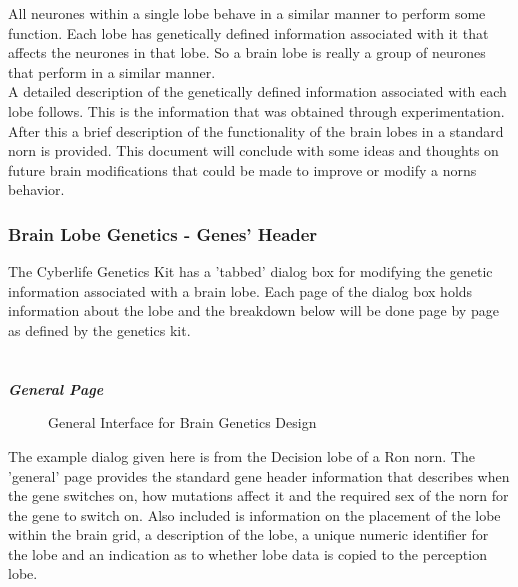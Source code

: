 \documentclass[11pt,twoside,a4paper]{article}
\begin{document}
All neurones within a single lobe behave in a similar manner to perform some function. Each lobe has genetically defined information associated with it that affects the neurones in that lobe. So a brain lobe is really a group of neurones that perform in a similar manner.~\\

A detailed description of the genetically defined information associated with each lobe follows. This is the information that was obtained through experimentation. After this a brief description of the functionality of the brain lobes in a standard norn is provided. This document will conclude with some ideas and thoughts on future brain modifications that could be made to improve or modify a norns behavior.

\subsubsection{Brain Lobe Genetics - Genes' Header}

The Cyberlife Genetics Kit has a 'tabbed' dialog box for modifying the genetic information associated with a brain lobe. Each page of the dialog box holds information about the lobe and the breakdown below will be done page by page as defined by the genetics kit.~\\~\\~\\

\textbf{\textit{General Page}}~\\

\begin{minipage}{0.4\linewidth}
\begin{figure}[H]
	\centerline {} %
	\caption{General Interface for Brain Genetics Design}
	\label{fig:brain_general}
\end{figure}
\end{minipage}
\begin{minipage}{0.1\linewidth}\end{minipage}
\begin{minipage}{0.5\linewidth}
The example dialog given here is from the Decision lobe of a Ron norn. The 'general' page provides the standard gene header information that describes when the gene switches on, how mutations affect it and the required sex of the norn for the gene to switch on. Also included is information on the placement of the lobe within the brain grid, a description of the lobe, a unique numeric identifier for the lobe and an indication as to whether lobe data is copied to the perception lobe.
\end{minipage}~\\
\end{document}
